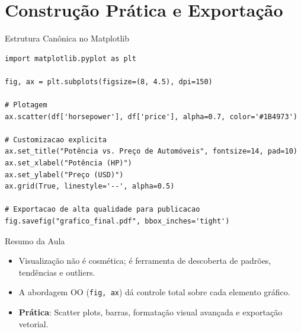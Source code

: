 \documentclass[aspectratio=169, 10pt]{beamer}
\begin{document}
\section{Construção Prática e Exportação}

\begin{frame}[fragile]{Estrutura Canônica no Matplotlib}
  \begin{lstlisting}
import matplotlib.pyplot as plt

fig, ax = plt.subplots(figsize=(8, 4.5), dpi=150)

# Plotagem
ax.scatter(df['horsepower'], df['price'], alpha=0.7, color='#1B4973')

# Customizacao explicita
ax.set_title("Potência vs. Preço de Automóveis", fontsize=14, pad=10)
ax.set_xlabel("Potência (HP)")
ax.set_ylabel("Preço (USD)")
ax.grid(True, linestyle='--', alpha=0.5)

# Exportacao de alta qualidade para publicacao
fig.savefig("grafico_final.pdf", bbox_inches='tight')
  \end{lstlisting}
\end{frame}

\begin{frame}{Resumo da Aula}
  \begin{itemize}
    \item Visualização não é cosmética; é ferramenta de descoberta de padrões, tendências e outliers.
    \item A abordagem OO (\texttt{fig, ax}) dá controle total sobre cada elemento gráfico.
    \item \textbf{Prática}: Scatter plots, barras, formatação visual avançada e exportação vetorial.
  \end{itemize}
\end{frame}
\end{document}
